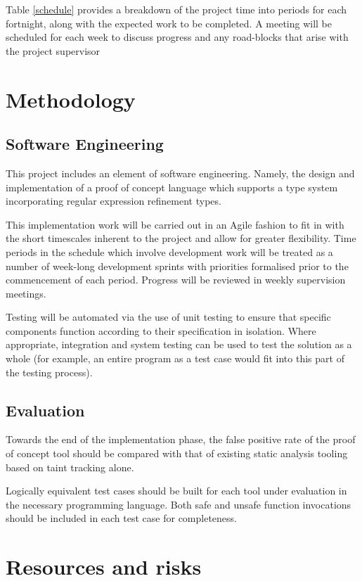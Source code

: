 \documentclass[a4paper,openany,12pt]{book}
\begin{document}
Table \ref{schedule} provides a breakdown of the project time into periods for each fortnight, along with the expected work to be completed. A meeting will be scheduled for each week to discuss progress and any road-blocks that arise with the project supervisor

\section*{Methodology}

\subsection*{Software Engineering}

This project includes an element of software engineering. Namely, the design and implementation of a proof of concept language which supports a type system incorporating regular expression refinement types.

This implementation work will be carried out in an Agile fashion to fit in with the short timescales inherent to the project and allow for greater flexibility. Time periods in the schedule which involve development work will be treated as a number of week-long development sprints with priorities formalised prior to the commencement of each period. Progress will be reviewed in weekly supervision meetings.

Testing will be automated via the use of unit testing to ensure that specific components function according to their specification in isolation. Where appropriate, integration and system testing can be used to test the solution as a whole (for example, an entire program as a test case would fit into this part of the testing process).

\subsection*{Evaluation}

Towards the end of the implementation phase, the false positive rate of the proof of concept tool should be compared with that of existing static analysis tooling based on taint tracking alone.

Logically equivalent test cases should be built for each tool under evaluation in the necessary programming language. Both safe and unsafe function invocations should be included in each test case for completeness.

\section*{Resources and risks}
\end{document}

